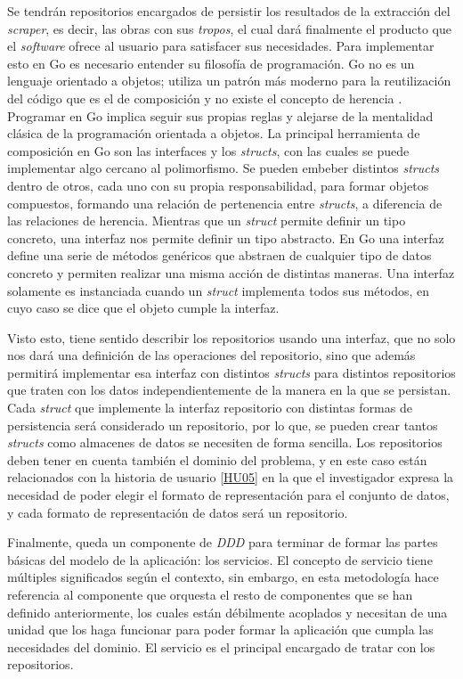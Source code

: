 Se tendrán repositorios encargados de persistir los resultados de la extracción
del \textit{scraper}, es decir, las obras con sus \textit{tropos}, el cual dará
finalmente el producto que el \textit{software} ofrece al usuario para
satisfacer sus necesidades. Para implementar esto en Go es necesario entender su
filosofía de programación. Go no es un lenguaje orientado a objetos; utiliza un
patrón más moderno para la reutilización del código que es el de composición y
no existe el concepto de herencia \cite{debnath_introduction_2022}. Programar en
Go implica seguir sus propias reglas y alejarse de la mentalidad clásica de la
programación orientada a objetos. La principal herramienta de composición en Go
son las interfaces y los \textit{structs}, con las cuales se puede implementar
algo cercano al polimorfismo. Se pueden embeber distintos \textit{structs}
dentro de otros, cada uno con su propia responsabilidad, para formar objetos
compuestos, formando una relación de pertenencia entre \textit{structs}, a
diferencia de las relaciones de herencia. Mientras que un \textit{struct}
permite definir un tipo concreto, una interfaz nos permite definir un tipo
abstracto. En Go una interfaz define una serie de métodos genéricos que abstraen
de cualquier tipo de datos concreto y permiten realizar una misma acción de
distintas maneras. Una interfaz solamente es instanciada cuando un
\textit{struct} implementa todos sus métodos, en cuyo caso se dice que el objeto
cumple la interfaz. 

Visto esto, tiene sentido describir los repositorios usando una interfaz, que no
solo nos dará una definición de las operaciones del repositorio, sino que además
permitirá implementar esa interfaz con distintos \textit{structs} para distintos
repositorios que traten con los datos independientemente de la manera en la que
se persistan. Cada \textit{struct} que implemente la interfaz repositorio con
distintas formas de persistencia será considerado un repositorio, por lo que, se
pueden crear tantos \textit{structs} como almacenes de datos se necesiten de
forma sencilla. Los repositorios deben tener en cuenta también el dominio del
problema, y en este caso están relacionados con la historia de usuario
\href{https://github.com/jlgallego99/TropesToGo/issues/30}{[HU05]} en la que el
investigador expresa la necesidad de poder elegir el formato de representación
para el conjunto de datos, y cada formato de representación de datos será un
repositorio.

Finalmente, queda un componente de \textit{DDD} para terminar de formar las
partes básicas del modelo de la aplicación: los servicios. El concepto de
servicio tiene múltiples significados según el contexto, sin embargo, en esta
metodología hace referencia al componente que orquesta el resto de componentes
que se han definido anteriormente, los cuales están débilmente acoplados y
necesitan de una unidad que los haga funcionar para poder formar la aplicación
que cumpla las necesidades del dominio. El servicio es el principal encargado de
tratar con los repositorios.

